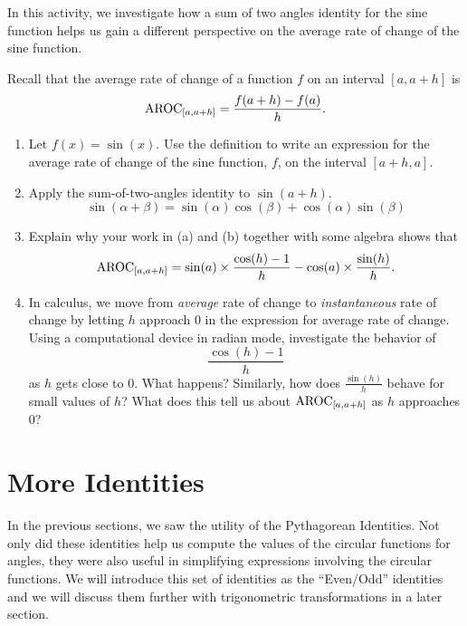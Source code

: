 \documentclass{ximera}
\begin{document}
\begin{exploration}
In this activity, we investigate how a sum of two angles identity for the sine function helps us gain a different perspective on the average rate of change of the sine function.%

Recall that the average rate of change of a function \(f\) on an interval \([a,a+h]\) is
\[
\mathrm{AROC}_{[a,a+h]} = \frac{f(a+h)-f(a)}{h}\text{.}
\]

\begin{enumerate}[label=\alph*.]
  \item Let \(f(x) = \sin(x)\).  Use the definition to write an expression for the average rate of change of the sine function, \( f \), on the interval \([a+h,a]\).
  
  \item Apply the sum-of-two-angles identity to \(\sin(a+h)\).
  \[
    \sin(\alpha + \beta) = \sin(\alpha) \cos(\beta) + \cos(\alpha) \sin(\beta)
  \]
  
  \item Explain why your work in (a) and (b) together with some algebra shows that
  \[
    \mathrm{AROC}_{[a,a+h]} = \sin(a) \times \frac{\cos(h)-1}{h} - \cos(a) \times \frac{\sin(h)}{h}\text{.}
  \]
  
  \item In calculus, we move from \emph{average} rate of change to \emph{instantaneous} rate of change by letting \(h\) approach \(0\) in the expression for average rate of change. Using a computational device in radian mode, investigate the behavior of
  \[
    \frac{\cos(h)-1}{h}
  \]
  as \(h\) gets close to \(0\). What happens? Similarly, how does \(\frac{\sin(h)}{h}\) behave for small values of \(h\)? What does this tell us about \(\mathrm{AROC}_{[a,a+h]}\) as \(h\) approaches \(0\)?
\end{enumerate}
\end{exploration}


\section{More Identities}
In the previous sections, we saw the utility of the Pythagorean Identities.
Not only did these identities help us compute the values of the circular functions for angles, they were also useful in simplifying expressions involving the circular functions.
We will introduce this set of identities as the ``Even/Odd'' identities and we will discuss them further with trigonometric transformations in a later section.
\end{document}
